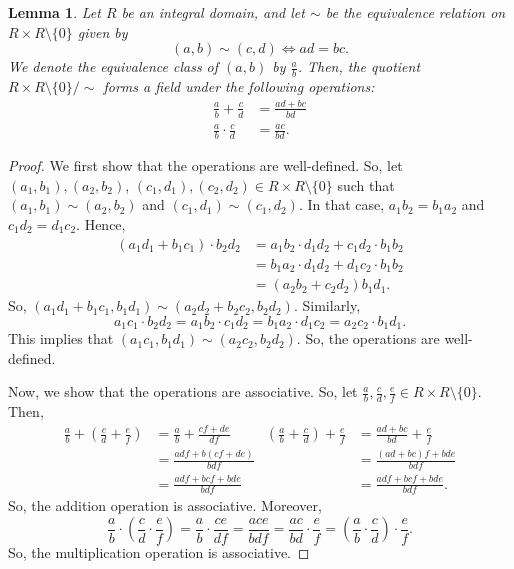 \documentclass[a4paper, openany]{memoir}
\theoremstyle{definition}
\theoremstyle{plain}
\newtheorem{lemma}[definition]{Lemma}
\begin{document}
    \begin{lemma}
        Let $R$ be an integral domain, and let $\sim$ be the equivalence relation on $R \times R \setminus \{0\}$ given by 
        \[(a, b) \sim (c, d) \iff ad = bc.\]
        We denote the equivalence class of $(a, b)$ by $\frac{a}{b}$. Then, the quotient $R \times R \setminus \{0\} / {\sim}$ forms a field under the following operations:
        \begin{align*}
            \frac{a}{b} + \frac{c}{d} &= \frac{ad + bc}{bd} \\
            \frac{a}{b} \cdot \frac{c}{d} &= \frac{ac}{bd}.
        \end{align*}
    \end{lemma}
    \begin{proof}
        We first show that the operations are well-defined. So, let $(a_1, b_1), (a_2, b_2)$, $(c_1, d_1), (c_2, d_2) \in R \times R \setminus \{0\}$ such that $(a_1, b_1) \sim (a_2, b_2)$ and $(c_1, d_1) \sim (c_1, d_2)$. In that case, $a_1b_2 = b_1a_2$ and $c_1d_2 = d_1c_2$. Hence,
        \begin{align*}
            (a_1 d_1 + b_1 c_1) \cdot b_2 d_2 &= a_1b_2 \cdot d_1d_2 + c_1d_2 \cdot b_1b_2 \\
            &= b_1a_2 \cdot d_1 d_2 + d_1c_2 \cdot b_1b_2 \\
            &= (a_2b_2 + c_2d_2) b_1d_1.
        \end{align*}
        So, $(a_1d_1 + b_1c_1, b_1d_1) \sim (a_2d_2 + b_2c_2, b_2d_2)$. Similarly, 
        \[a_1c_1 \cdot b_2d_2 = a_1 b_2 \cdot c_1d_2 = b_1a_2 \cdot d_1c_2 = a_2c_2 \cdot b_1d_1.\]
        This implies that $(a_1c_1, b_1d_1) \sim (a_2c_2, b_2d_2)$. So, the operations are well-defined.

        Now, we show that the operations are associative. So, let $\frac{a}{b}, \frac{c}{d}, \frac{e}{f} \in R \times R \setminus \{0\}$. Then,
        \begin{align*}
            \frac{a}{b} + \left(\frac{c}{d} + \frac{e}{f}\right) &= \frac{a}{b} + \frac{cf + de}{df} & \left(\frac{a}{b} + \frac{c}{d}\right) + \frac{e}{f} &= \frac{ad + bc}{bd} + \frac{e}{f} \\
            &= \frac{adf + b(cf + de)}{bdf} & &= \frac{(ad + bc)f + bde}{bdf} \\
            &= \frac{adf + bcf + bde}{bdf} & &= \frac{adf + bcf + bde}{bdf}.
        \end{align*}
        So, the addition operation is associative. Moreover,
        \[\frac{a}{b} \cdot \left(\frac{c}{d} \cdot \frac{e}{f}\right) = \frac{a}{b} \cdot \frac{ce}{df} = \frac{ace}{bdf} = \frac{ac}{bd} \cdot \frac{e}{f} = \left(\frac{a}{b} \cdot \frac{c}{d}\right) \cdot \frac{e}{f}.\]
        So, the multiplication operation is associative.


\end{proof}
\end{document}
